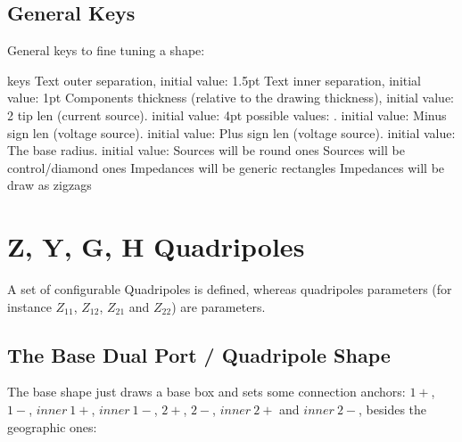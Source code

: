 \documentclass[10pt]{article}
\begin{document}
\subsection{General Keys}\label{generalkeys}
General keys to fine tuning a shape:
\begin{describelist*}[30mm]{keys}
    {Text outer separation, initial value: 1.5pt}
    {Text inner separation, initial value: 1pt}
   {Components thickness (relative to the drawing thickness), initial value: 2}
   {tip len (current source). initial value: 4pt}
   {possible values: . initial value: }
    {Minus sign len (voltage source). initial value: }
    {Plus sign len (voltage source). initial value: }
   {The base radius. initial value: }
   {Sources will be round ones}
   {Sources will be control/diamond ones}
   {Impedances will be generic rectangles}
   {Impedances will be draw as zigzags}
\end{describelist*}




\section{Z, Y, G, H Quadripoles}\label{quadanchors}
A set of configurable Quadripoles is defined, whereas quadripoles parameters (for instance $Z_{11}$, $Z_{12}$, $Z_{21}$ and $Z_{22}$) are  parameters.
\subsection{The Base Dual Port / Quadripole Shape}
The base shape just draws a base box and sets some connection anchors: $1+$, $1-$, $inner\ 1+$, $inner\ 1-$, $2+$, $2-$, $inner\ 2+$ and $inner\ 2-$, besides the geographic ones:


\begin{center}%
\end{center}
\end{document}
